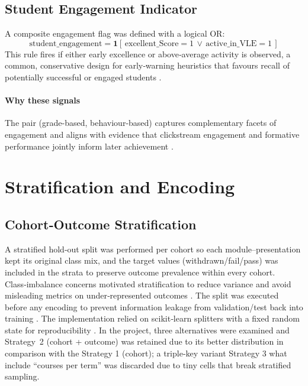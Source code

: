 \documentclass[ %
                    author={Carlos Duran Calle},
                supervisor={Dr. Felipe Campelo},
                    degree={MSc},
                     title={Comparative Machine Learning Analysis for Student Dropout Prediction in a Virtual Learning Environment},
                  subtitle={Incorporating Student Engagement and Socio-Economic Features},
                      type={},
                      year={2025}]{dissertation}
\begin{document}
\subsection{Student Engagement Indicator}
A composite engagement flag was defined with a logical OR:
\begin{equation}
	\text{student\_engagement} = \mathbf{1}\!\left[ \, \text{excellent\_Score} = 1 \, \lor \, \text{active\_in\_VLE} = 1 \, \right]
	\tag{2.3}
\end{equation}
This rule fires if either early excellence or above‑average activity is observed, a common, conservative design for early‑warning heuristics that favours recall of potentially successful or engaged students \cite{macfadyen_mining_2010}.

\paragraph{Why these signals}
The pair (grade-based, behaviour-based) captures complementary facets of engagement and aligns with evidence that clickstream engagement and formative performance jointly inform later achievement \cite{baker_benefits_2020}.

\section{Stratification and Encoding}
\subsection{Cohort‑Outcome Stratification}
A stratified hold‑out split was performed per cohort so each module–presentation kept its original class mix, and the target values (withdrawn/fail/pass) was included in the strata to preserve outcome prevalence within every cohort. Class‑imbalance concerns motivated stratification to reduce variance and avoid misleading metrics on under‑represented outcomes \cite{he_learning_2009}. The split was executed before any encoding to prevent information leakage from validation/test back into training \cite{kaufman_leakage_2012}. The implementation relied on scikit‑learn splitters with a fixed random state for reproducibility \cite{pedregosa_scikit-learn_2011}. In the project, three alternatives were examined and Strategy 2 (cohort + outcome) was retained due to its better distribution in comparison with the Strategy 1 (cohort); a triple‑key variant Strategy 3 what include “courses per term” was discarded due to tiny cells that break stratified sampling.
\end{document}
